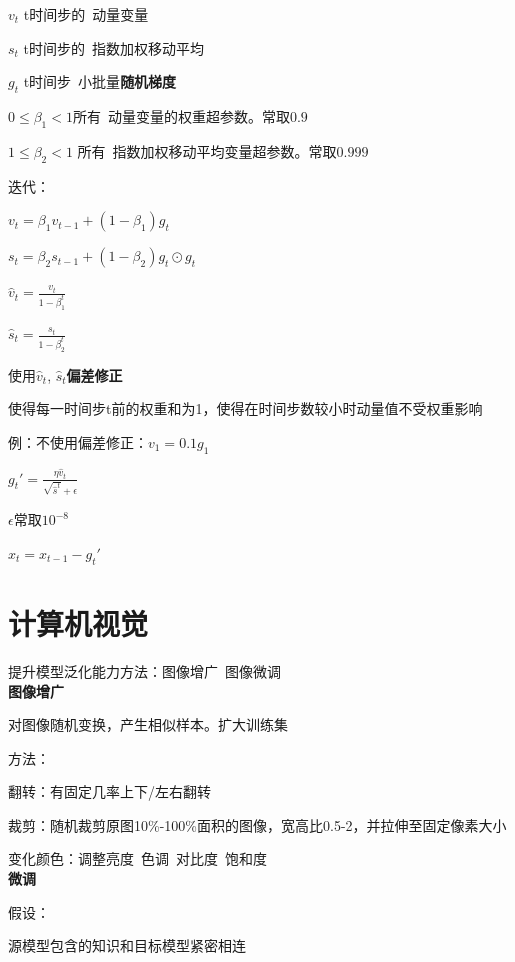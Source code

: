 \documentclass[UTF8]{ctexart}
\begin{document}
  \quad $v_t$ t时间步的\ 动量变量

  \quad $s_t$ t时间步的\ 指数加权移动平均

  \quad $g_t$ t时间步\ 小批量\textbf{随机梯度}

  \quad $0\leq \beta_1<1$所有\ 动量变量的权重超参数。常取$0.9$
  
  \quad $1\leq \beta_2<1$ 所有\ 指数加权移动平均变量超参数。常取$0.999$

  迭代：

  \quad $v_t = \beta_1v_{t-1} + (1 -\beta_1)g_t$

  \quad $s_t = \beta_2 s_{t-1} + (1-\beta_2)g_t \odot g_t$

  \quad $\hat{v}_t = \frac{v_t}{1-\beta_1^t}$

  \quad $\hat{s}_t = \frac{s_t}{1-\beta_2^t}$

  \quad \quad 使用$\hat{v}_t$, $\hat{s}_t$\textbf{偏差修正}
  
  \quad \quad \quad 使得每一时间步t前的权重和为1，使得在时间步数较小时动量值不受权重影响

  \quad \quad \quad \quad 例：不使用偏差修正：$v_1 = 0.1g_1$

  \quad $g_t' = \frac{\eta \hat{v}_t}{\sqrt{\hat{s}^t} + \epsilon}$

  \quad \quad $\epsilon $常取$10^{-8}$

  \quad $x_t = x_{t-1} - g_t'$


\section{计算机视觉}
\noindent 提升模型泛化能力方法：图像增广\ 图像微调\\
\textbf{图像增广}

  对图像随机变换，产生相似样本。扩大训练集

  方法：

  \quad 翻转：有固定几率上下/左右翻转

  \quad 裁剪：随机裁剪原图10\%-100\%面积的图像，宽高比0.5-2，并拉伸至固定像素大小

  \quad 变化颜色：调整亮度\ 色调\ 对比度\ 饱和度\\
\textbf{微调}

  假设：

  \quad 源模型包含的知识和目标模型紧密相连
  
\end{document}
